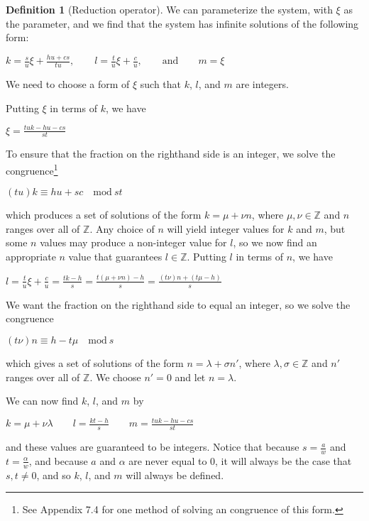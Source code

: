 \documentclass{article}
\theoremstyle{definition}
\newtheorem{definition}{Definition}[section]
\theoremstyle{theorem}
\theoremstyle{example}
\theoremstyle{corollary}
\begin{document}
\begin{definition}[Reduction operator]
\bigskip

We can parameterize the system, with \(\xi\) as the parameter, and we find that the system has infinite solutions of the following form:
\begin{center}
\(k = \frac{s}{u} \xi + \frac{hu + cs}{tu}, \quad \quad l = \frac{t}{u} \xi + \frac{c}{u}, \quad \quad \textrm{and} \quad \quad m = \xi\)
\end{center}

\bigskip

We need to choose a form of \(\xi\) such that \(k\), \(l\), and \(m\) are integers.

\bigskip

Putting \(\xi\) in terms of \(k\), we have
\begin{center}
\(\xi = \frac{tuk - hu - cs}{st}\)
\end{center}

\bigskip

To ensure that the fraction on the righthand side is an integer, we solve the congruence\footnote{See Appendix 7.4 for one method of solving an congruence of this form.}
\begin{center}
\((tu)k \equiv hu + sc \quad \textrm{mod} \ st\)
\end{center}
which produces a set of solutions of the form \(k = \mu + \nu n\), where \(\mu, \nu \in \mathbb{Z}\) and \(n\) ranges over all of \(\mathbb{Z}\). Any choice of \(n\) will yield integer values for \(k\) and \(m\), but some \(n\) values may produce a non-integer value for \(l\), so we now find an appropriate \(n\) value that guarantees \(l \in \mathbb{Z}\). Putting \(l\) in terms of \(n\), we have
\begin{center}
\(l = \frac{t}{u} \xi + \frac{c}{u} = \frac{tk - h}{s} = \frac{t(\mu + \nu n) - h}{s} = \frac{(t\nu)n + (t\mu - h)}{s}\)
\end{center}

\bigskip

We want the fraction on the righthand side to equal an integer, so we solve the congruence
\begin{center}
\((t\nu)n \equiv h - t\mu \quad \textrm{mod} \ s\)
\end{center}
which gives a set of solutions of the form \(n = \lambda + \sigma n'\), where \(\lambda, \sigma \in \mathbb{Z}\) and \(n'\) ranges over all of \(\mathbb{Z}\). We choose \(n' = 0\) and let \(n = \lambda\).

\bigskip

We can now find \(k\), \(l\), and \(m\) by
\begin{center}
\(k = \mu + \nu \lambda \quad \quad l = \frac{kt - h}{s} \quad \quad m = \frac{tuk - hu - cs}{st}\)
\end{center}
and these values are guaranteed to be integers. Notice that because \(s = \frac{a}{w}\) and \(t = \frac{\alpha}{w}\), and because \(a\) and \(\alpha\) are never equal to \(0\), it will always be the case that \(s, t \ne 0\), and so \(k\), \(l\), and \(m\) will always be defined.


\end{definition}
\end{document}
